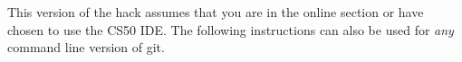 \documentclass[12pt]{scrartcl}
\begin{document}
%
%
%
%
%

This version of the hack assumes that you are in the online
section or have chosen to use the CS50 IDE.  The following
instructions can also be used for \emph{any} command line 
version of git.
\end{document}
